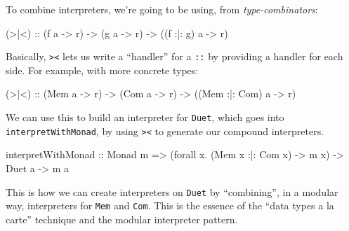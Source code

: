 \documentclass[]{article}
\newenvironment{Shaded}{}{}
\newcommand{\DataTypeTok}[1]{\textcolor[rgb]{0.56,0.13,0.00}{#1}}
\newcommand{\FunctionTok}[1]{\textcolor[rgb]{0.02,0.16,0.49}{#1}}
\newcommand{\NormalTok}[1]{#1}
\newcommand{\OtherTok}[1]{\textcolor[rgb]{0.00,0.44,0.13}{#1}}
\begin{document}
To combine interpreters, we're going to be using, from \emph{type-combinators}:

\begin{Shaded}
\begin{Highlighting}[]
\OtherTok{(>|<) ::}\NormalTok{ (f a }\OtherTok{->}\NormalTok{ r)}
      \OtherTok{->}\NormalTok{ (g a }\OtherTok{->}\NormalTok{ r)}
      \OtherTok{->}\NormalTok{ ((f }\FunctionTok{:|:}\NormalTok{ g) a }\OtherTok{->}\NormalTok{ r)}
\end{Highlighting}
\end{Shaded}

Basically, \texttt{\textgreater{}\textbar{}\textless{}} lets us write a
``handler'' for a \texttt{:\textbar{}:} by providing a handler for each side.
For example, with more concrete types:

\begin{Shaded}
\begin{Highlighting}[]
\OtherTok{(>|<) ::}\NormalTok{ (}\DataTypeTok{Mem}\NormalTok{ a           }\OtherTok{->}\NormalTok{ r)}
      \OtherTok{->}\NormalTok{ (}\DataTypeTok{Com}\NormalTok{ a           }\OtherTok{->}\NormalTok{ r)}
      \OtherTok{->}\NormalTok{ ((}\DataTypeTok{Mem} \FunctionTok{:|:} \DataTypeTok{Com}\NormalTok{) a }\OtherTok{->}\NormalTok{ r)}
\end{Highlighting}
\end{Shaded}

We can use this to build an interpreter for \texttt{Duet}, which goes into
\texttt{interpretWithMonad}, by using
\texttt{\textgreater{}\textbar{}\textless{}} to generate our compound
interpreters.

\begin{Shaded}
\begin{Highlighting}[]
\NormalTok{interpretWithMonad}
\OtherTok{    ::} \DataTypeTok{Monad}\NormalTok{ m}
    \OtherTok{=>}\NormalTok{ (forall x}\FunctionTok{.}\NormalTok{ (}\DataTypeTok{Mem}\NormalTok{ x }\FunctionTok{:|:} \DataTypeTok{Com}\NormalTok{ x) }\OtherTok{->}\NormalTok{ m x)}
    \OtherTok{->} \DataTypeTok{Duet}\NormalTok{ a}
    \OtherTok{->}\NormalTok{ m a}
\end{Highlighting}
\end{Shaded}

This is how we can create interpreters on \texttt{Duet} by ``combining'', in a
modular way, interpreters for \texttt{Mem} and \texttt{Com}. This is the essence
of the ``data types a la carte'' technique and the modular interpreter pattern.
\end{document}
